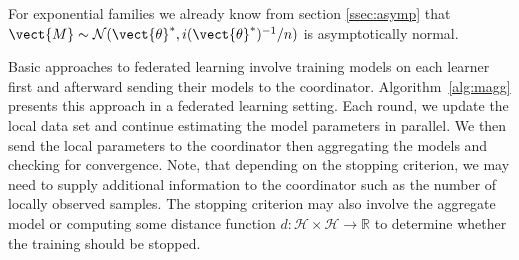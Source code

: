 For exponential families we already know from section \ref{ssec:asymp} that $\vect{M} \sim \mathcal{N}(\vect{\theta}^*, i(\vect{\theta}^*)^{-1}/n)$ is asymptotically normal.

Basic approaches to federated learning involve training models on each learner first and afterward sending their models to the coordinator.
Algorithm~\ref{alg:magg} presents this approach in a federated learning setting. 
Each round, we update the local data set and continue estimating the model parameters in parallel. 
We then send the local parameters to the coordinator then aggregating the models and checking for convergence.
Note, that depending on the stopping criterion, we may need to supply additional information to the coordinator such as the number of locally observed samples. 
The stopping criterion may also involve the aggregate model or computing some distance function $d: \mathcal{H} \times \mathcal{H}  \rightarrow \mathbb{R}$  to determine whether the training should be stopped.
